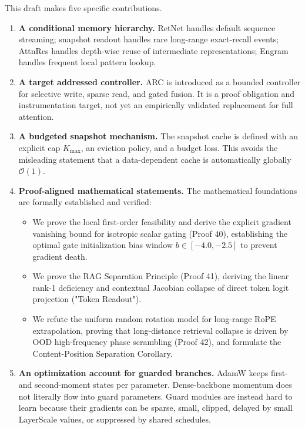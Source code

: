 \documentclass[11pt]{article}
\newcommand{\Oh}{\mathcal{O}}
\begin{document}
This draft makes five specific contributions.
\begin{enumerate}
    \item \textbf{A conditional memory hierarchy.} RetNet handles default sequence streaming; snapshot readout handles rare long-range exact-recall events; AttnRes handles depth-wise reuse of intermediate representations; Engram handles frequent local pattern lookup.
    \item \textbf{A target addressed controller.} ARC is introduced as a bounded controller for selective write, sparse read, and gated fusion. It is a proof obligation and instrumentation target, not yet an empirically validated replacement for full attention.
    \item \textbf{A budgeted snapshot mechanism.} The snapshot cache is defined with an explicit cap $K_{\max}$, an eviction policy, and a budget loss. This avoids the misleading statement that a data-dependent cache is automatically globally $\Oh(1)$.
    \item \textbf{Proof-aligned mathematical statements.} The mathematical foundations are formally established and verified:
    \begin{itemize}
        \item We prove the local first-order feasibility and derive the explicit gradient vanishing bound for isotropic scalar gating (Proof 40), establishing the optimal gate initialization bias window $b \in [-4.0, -2.5]$ to prevent gradient death.
        \item We prove the RAG Separation Principle (Proof 41), deriving the linear rank-1 deficiency and contextual Jacobian collapse of direct token logit projection ("Token Readout").
        \item We refute the uniform random rotation model for long-range RoPE extrapolation, proving that long-distance retrieval collapse is driven by OOD high-frequency phase scrambling (Proof 42), and formulate the Content-Position Separation Corollary.
    \end{itemize}
    \item \textbf{An optimization account for guarded branches.} AdamW keeps first- and second-moment states per parameter. Dense-backbone momentum does not literally flow into guard parameters. Guard modules are instead hard to learn because their gradients can be sparse, small, clipped, delayed by small LayerScale values, or suppressed by shared schedules.
\end{enumerate}
\end{document}
